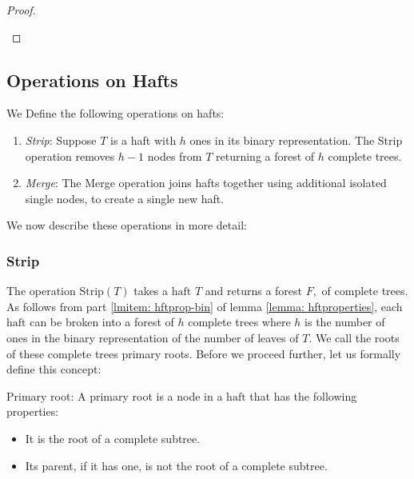 \documentclass[11pt, letter]{article}
\newcommand{\haft}{\mathrm{haft}}
\newcommand{\Strip}{\mathrm{Strip}}
\begin{document}
\begin{proof}
\begin{enumerate}
\end{enumerate}


\end{proof}



\subsection{Operations on Hafts}
We Define the following operations on hafts:
\begin{enumerate}
\item \emph{Strip}: Suppose $T$ is a haft with $h$ ones in its binary representation. The Strip operation removes 
$h-1$ nodes from $T$ returning  a forest of $h$ complete trees. 

\item \emph{Merge}: The Merge operation joins  hafts together using additional isolated single nodes,
to create a single new haft.
\end{enumerate}

We now describe these operations in more detail:

\subsubsection{Strip}
\label{subsec: haftstrip}
The operation $\Strip(T)$ takes a $\haft$ $T$ and returns a forest $F,$ of complete trees.  As follows from part \ref{lmitem: hftprop-bin} of lemma \ref{lemma: hftproperties}, each $\haft$ can be broken into a forest of $h$ complete trees where $h$ is the number of ones in the binary representation of the number of leaves of $T$. We call the roots of these complete trees primary roots. Before we proceed further, let us formally define this concept:

\begin{description}
\item{Primary root:} A primary root is a node in a $\haft$ that has the following properties:
\begin{itemize}
\item It is the root of a complete subtree.
\item Its parent, if it has one, is not the root of a complete subtree.
\end{itemize}
\end{description}
\end{document}
